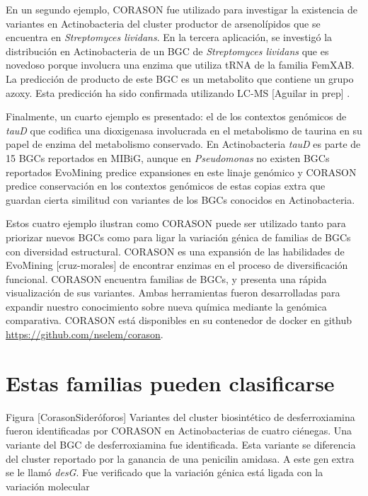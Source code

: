 \documentclass[12pt,twoside]{reedthesis}
\begin{document}
  En un segundo ejemplo, CORASON fue utilizado para investigar la
  existencia de variantes en Actinobacteria del cluster productor de
  arsenolípidos que se encuentra en \emph{Streptomyces lividans}. En la
  tercera aplicación, se investigó la distribución en Actinobacteria de un
  BGC de \emph{Streptomyces lividans} que es novedoso porque involucra una
  enzima que utiliza tRNA de la familia FemXAB. La predicción de producto
  de este BGC es un metabolito que contiene un grupo azoxy. Esta
  predicción ha sido confirmada utilizando LC-MS {[}Aguilar in prep{]} .
  
  Finalmente, un cuarto ejemplo es presentado: el de los contextos
  genómicos de \emph{tauD} que codifica una dioxigenasa involucrada en el
  metabolismo de taurina en su papel de enzima del metabolismo conservado.
  En Actinobacteria \emph{tauD} es parte de 15 BGCs reportados en MIBiG,
  aunque en \emph{Pseudomonas} no existen BGCs reportados EvoMining
  predice expansiones en este linaje genómico y CORASON predice
  conservación en los contextos genómicos de estas copias extra que
  guardan cierta similitud con variantes de los BGCs conocidos en
  Actinobacteria.
  
  Estos cuatro ejemplo ilustran como CORASON puede ser utilizado tanto
  para priorizar nuevos BGCs como para ligar la variación génica de
  familias de BGCs con diversidad estructural. CORASON es una expansión de
  las habilidades de EvoMining {[}cruz-morales{]} de encontrar enzimas en
  el proceso de diversificación funcional. CORASON encuentra familias de
  BGCs, y presenta una rápida visualización de sus variantes. Ambas
  herramientas fueron desarrolladas para expandir nuestro conocimiento
  sobre nueva química mediante la genómica comparativa. CORASON está
  disponibles en su contenedor de docker en github
  \url{https://github.com/nselem/corason}.
  
  \section{Estas familias pueden
  clasificarse}\label{estas-familias-pueden-clasificarse}
  
  Figura {[}CorasonSideróforos{]} Variantes del cluster biosintético de
  desferroxiamina fueron identificadas por CORASON en Actinobacterias de
  cuatro ciénegas. Una variante del BGC de desferroxiamina fue
  identificada. Esta variante se diferencia del cluster reportado por la
  ganancia de una penicilin amidasa. A este gen extra se le llamó
  \emph{desG}. Fue verificado que la variación génica está ligada con la
  variación molecular
  
\end{document}
